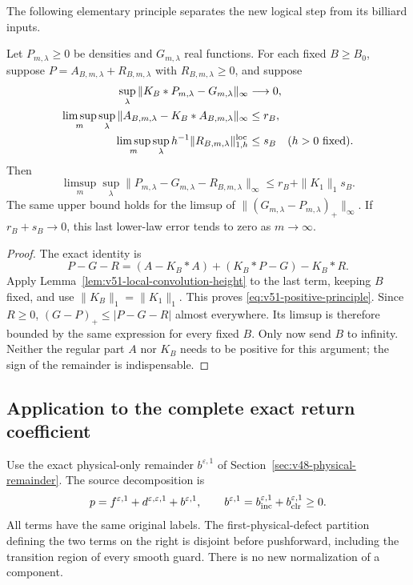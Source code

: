 The following elementary principle separates the new logical step
from its billiard inputs.
\begin{proposition}
\label{prop:v51-positive-principle}
Let $P_{m,\lambda}\ge0$ be densities and $G_{m,\lambda}$ real
functions. For each fixed $B\ge B_0$, suppose
$P=A_{B,m,\lambda}+R_{B,m,\lambda}$ with $R_{B,m,\lambda}\ge0$,
and suppose
\begin{align*}
 \sup_\lambda\|K_B*P_{m,\lambda}-G_{m,\lambda}\|_\infty&\longrightarrow0,\\
 \limsup_m\sup_\lambda\|A_{B,m,\lambda}-K_B*A_{B,m,\lambda}\|_\infty&\le r_B,\\
 \limsup_m\sup_\lambda h^{-1}
                 \|R_{B,m,\lambda}\|_{1,h}^{\rm loc}&\le s_B
                         \quad(h>0\hbox{ fixed}).
\end{align*}
Then
\begin{equation}\label{eq:v51-positive-principle}
 \limsup_m\sup_\lambda
 \|P_{m,\lambda}-G_{m,\lambda}-R_{B,m,\lambda}\|_\infty
                                  \le r_B+\|K_1\|_1s_B.
\end{equation}
The same upper bound holds for the limsup of
$\|(G_{m,\lambda}-P_{m,\lambda})_+\|_\infty$.
If $r_B+s_B\to0$, this last lower-law error tends to zero as
$m\to\infty$.
\end{proposition}
\begin{proof}
The exact identity is
\[
 P-G-R=(A-K_B*A)+(K_B*P-G)-K_B*R.
\]
Apply Lemma~\ref{lem:v51-local-convolution-height} to the last term,
keeping $B$ fixed, and use $\|K_B\|_1=\|K_1\|_1$.
This proves \eqref{eq:v51-positive-principle}. Since $R\ge0$,
$(G-P)_+\le|P-G-R|$ almost everywhere. Its limsup is therefore
bounded by the same expression for every fixed $B$. Only now send
$B$ to infinity. Neither the regular part $A$ nor $K_B$ needs to be
positive for this argument; the sign of the remainder is indispensable.
\end{proof}

\subsection{Application to the complete exact return coefficient}
Use the exact physical-only remainder $b^{\varepsilon,1}$ of
Section~\ref{sec:v48-physical-remainder}. The source decomposition is
\begin{equation}\label{eq:v51-exact-positive-split}
 p=f^{\varepsilon,1}+d^{\varepsilon,\varepsilon,1}
                                    +b^{\varepsilon,1},\qquad
 b^{\varepsilon,1}=b_{\rm inc}^{\varepsilon,1}
                                    +b_{\rm clr}^{\varepsilon,1}\ge0.
\end{equation}
All terms have the same original labels. The first-physical-defect
partition defining the two terms on the right is disjoint before
pushforward, including the transition region of every smooth guard.
There is no new normalization of a component.


